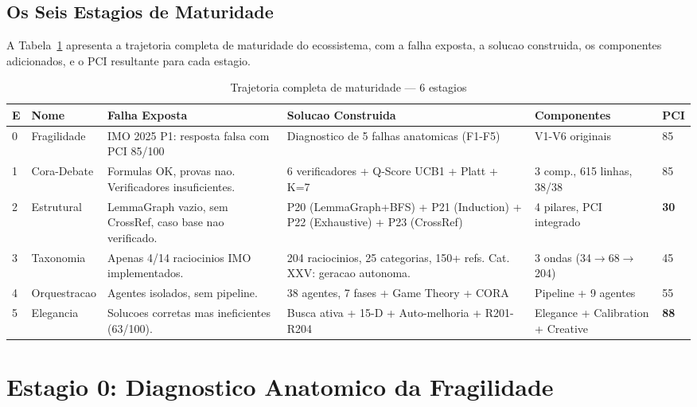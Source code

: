 \documentclass[5p]{elsarticle}
\begin{document}
\subsection{Os Seis Estagios de Maturidade}

A Tabela~\ref{tab:stages} apresenta a trajetoria completa de maturidade do
ecossistema, com a falha exposta, a solucao construida, os componentes adicionados,
e o PCI resultante para cada estagio.

\begin{table}[H]
  \centering
  \caption{Trajetoria completa de maturidade — 6 estagios}
  \label{tab:stages}
  \scriptsize
  \setlength{\tabcolsep}{3pt}
  \begin{tabular}{p{0.3cm}p{1.2cm}p{2.5cm}p{3.5cm}p{2.3cm}p{1.2cm}}
    \toprule
    \textbf{E} & \textbf{Nome} & \textbf{Falha Exposta} & \textbf{Solucao Construida} & \textbf{Componentes} & \textbf{PCI}\\
    \midrule
    0 & Fragilidade & IMO 2025 P1: resposta falsa com PCI 85/100 & Diagnostico de 5 falhas anatomicas (F1-F5) & V1-V6 originais & 85\\
    \rowcolor{redbg}
    1 & Cora-Debate & Formulas OK, provas nao. Verificadores insuficientes. & 6 verificadores + Q-Score UCB1 + Platt + K=7 & 3 comp., 615 linhas, 38/38 & 85\\
    2 & Estrutural & LemmaGraph vazio, sem CrossRef, caso base nao verificado. & P20 (LemmaGraph+BFS) + P21 (Induction) + P22 (Exhaustive) + P23 (CrossRef) & 4 pilares, PCI integrado & \textbf{30}\\
    \rowcolor{yellowbg}
    3 & Taxonomia & Apenas 4/14 raciocinios IMO implementados. & 204 raciocinios, 25 categorias, 150+ refs. Cat. XXV: geracao autonoma. & 3 ondas (34$\to$68$\to$204) & 45\\
    4 & Orquestracao & Agentes isolados, sem pipeline. & 38 agentes, 7 fases + Game Theory + CORA & Pipeline + 9 agentes & 55\\
    \rowcolor{greenbg}
    5 & Elegancia & Solucoes corretas mas ineficientes (63/100). & Busca ativa + 15-D + Auto-melhoria + R201-R204 & Elegance + Calibration + Creative & \textbf{88}\\
    \bottomrule
  \end{tabular}
\end{table}

\section{Estagio 0: Diagnostico Anatomico da Fragilidade}
\end{document}
